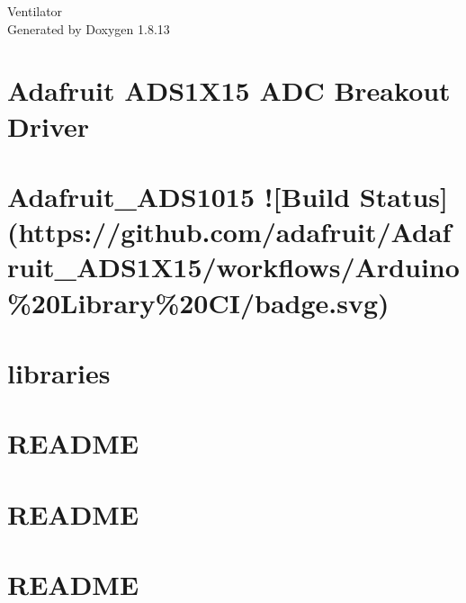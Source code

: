 \documentclass[twoside]{book}
\newcommand{\+}{\discretionary{\mbox{\scriptsize$\hookleftarrow$}}{}{}}
\newcommand{\clearemptydoublepage}{%
  \newpage{\pagestyle{empty}\cleardoublepage}%
}
\begin{document}
\hypersetup{pageanchor=false,
             bookmarksnumbered=true,
             pdfencoding=unicode
            }
\begin{titlepage}
\vspace*{7cm}
\begin{center}%
{\Large Ventilator }\\
\vspace*{1cm}
{\large Generated by Doxygen 1.8.13}\\
\end{center}
\end{titlepage}
\clearemptydoublepage
{}
\tableofcontents
\clearemptydoublepage
{}
\hypersetup{pageanchor=true}

\chapter{Adafruit A\+D\+S1\+X15 A\+DC Breakout Driver}
\label{index}\hypertarget{index}{}
\chapter{Adafruit\+\_\+\+A\+D\+S1015 !\mbox{[}Build Status\mbox{]}(https\+://github.com/adafruit/\+Adafruit\+\_\+\+A\+D\+S1\+X15/workflows/\+Arduino\%20\+Library\%20\+C\+I/badge.svg)}
\label{md_3plibs__adafruit__a_d_s1_x15__r_e_a_d_m_e}

\chapter{libraries}
\label{md_3plibs_libraries}

\chapter{R\+E\+A\+D\+ME}
\label{md_3plibs__ms_timer2__r_e_a_d_m_e}

\chapter{R\+E\+A\+D\+ME}
\label{md_ext_display__r_e_a_d_m_e}

\chapter{R\+E\+A\+D\+ME}
\label{md__r_e_a_d_m_e}

\end{document}
